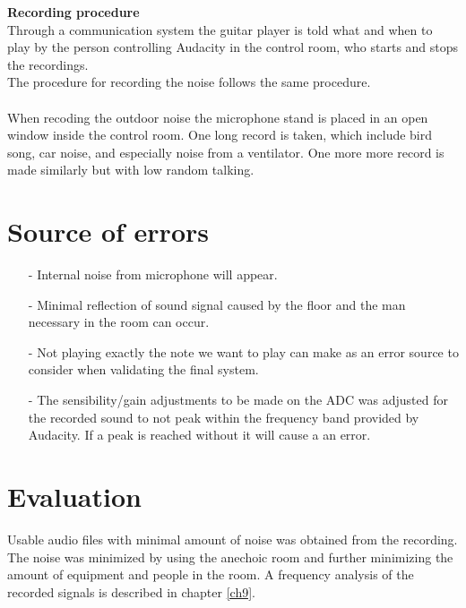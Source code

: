 \textbf{Recording procedure}\\
Through a communication system the guitar player is told what and when to play by the person controlling Audacity in the control room, who starts and stops the recordings. \\
The procedure for recording the noise follows the same procedure.\\
\\
When recoding the outdoor noise the microphone stand is placed in an open window inside the control room. One long record is taken, which include bird song, car noise, and especially noise from a ventilator. One more more record is made similarly but with low random talking.

\section{Source of errors}
\begin{itemize}
\item[-] Internal noise from microphone will appear. 
\item[-] Minimal reflection of sound signal caused by the floor and the man necessary in the room can occur. 
\item[-] Not playing exactly the note we want to play can make as an error source to consider when validating the final system.
\item[-] The sensibility/gain adjustments to be made on the ADC was adjusted for the recorded sound to not peak within the frequency band provided by Audacity. If a peak is reached without it will cause a an error.            
\end{itemize}

\section{Evaluation}
Usable audio files with minimal amount of noise was obtained from the recording. The noise was minimized by using the anechoic room and further minimizing the amount of equipment and  people in the room.       
A frequency analysis of the recorded signals is described in chapter \ref{ch9}.  

